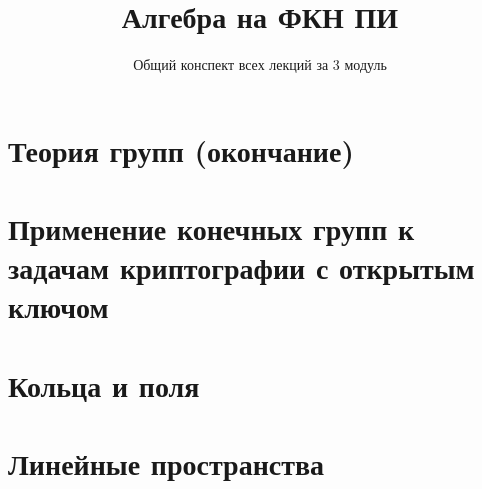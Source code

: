 \documentclass[a4paper,11pt]{article}
\title{Алгебра на ФКН ПИ}
\author{Общий конспект всех лекций за 3 модуль}
\begin{document}
    \maketitle

    \section{Теория групп (окончание)}
    
    

    \newpage
    \section{Применение конечных групп к задачам криптографии с открытым ключом}

    

    \newpage
    \section{Кольца и поля}

    

    \newpage
    \section{Линейные пространства}

    
\end{document}
